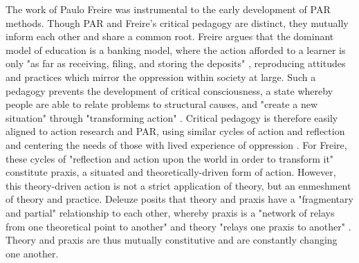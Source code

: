 The work of Paulo Freire was instrumental to the early development of PAR methods. Though PAR and Freire's critical pedagogy are distinct, they mutually inform each other and share a common root. Freire argues that the dominant model of education is a banking model, where the action afforded to a learner is only "as far as receiving, filing, and storing the deposits" \citep[p. 72]{freire_pedagogy_2000}, reproducing attitudes and practices which mirror the oppression within society at large. Such a pedagogy prevents the development of critical consciousness, a state whereby people are able to relate problems to structural causes, and "create a new situation" through "transforming action" \cite[p. 47]{freire_pedagogy_2000}. Critical pedagogy is therefore easily aligned to action research and PAR, using similar cycles of action and reflection and centering the needs of those with lived experience of oppression \citep{serpa_political-pedagogical_2020}. For Freire, these cycles of "reflection and action upon the world in order to transform it" \cite[p. 51]{freire_pedagogy_2000} constitute praxis, a situated and theoretically-driven form of action. However, this theory-driven action is not a strict application of theory, but an enmeshment of theory and practice. Deleuze posits that theory and praxis have a "fragmentary and partial" relationship to each other, whereby praxis is a "network of relays from one theoretical point to another" and theory "relays one praxis to another" \citep[p. 206]{deleuze_desert_2004}. Theory and praxis are thus mutually constitutive and are constantly changing one another.

